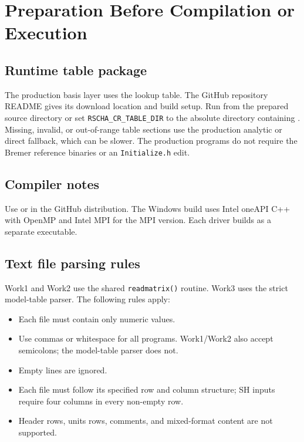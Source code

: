 \documentclass[11pt,a4paper]{article}
\begin{document}
\section{Preparation Before Compilation or Execution}

\subsection{Runtime table package}

The production basis layer uses the  lookup table. The GitHub
repository README gives its download location and build setup. Run from
the prepared source directory or set \texttt{RSCHA\_CR\_TABLE\_DIR} to
the absolute directory containing . Missing, invalid, or out-of-range table sections use the
production analytic or direct fallback, which can be slower. The production
programs do not require the Bremer reference binaries or an
\texttt{Initialize.h} edit.

\subsection{Compiler notes}

Use  or 
in the GitHub distribution. The Windows build uses Intel oneAPI C++ with
OpenMP and Intel MPI for the MPI version. Each driver builds as a separate
executable.

\subsection{Text file parsing rules}

Work1 and Work2 use the shared \texttt{readmatrix()} routine. Work3 uses the strict model-table parser. The following rules apply:
\begin{itemize}
  \item Each file must contain only numeric values.
  \item Use commas or whitespace for all programs. Work1/Work2 also accept semicolons; the model-table parser does not.
  \item Empty lines are ignored.
  \item Each file must follow its specified row and column structure; SH inputs require four columns in every non-empty row.
  \item Header rows, units rows, comments, and mixed-format content are not supported.
\end{itemize}
\end{document}
